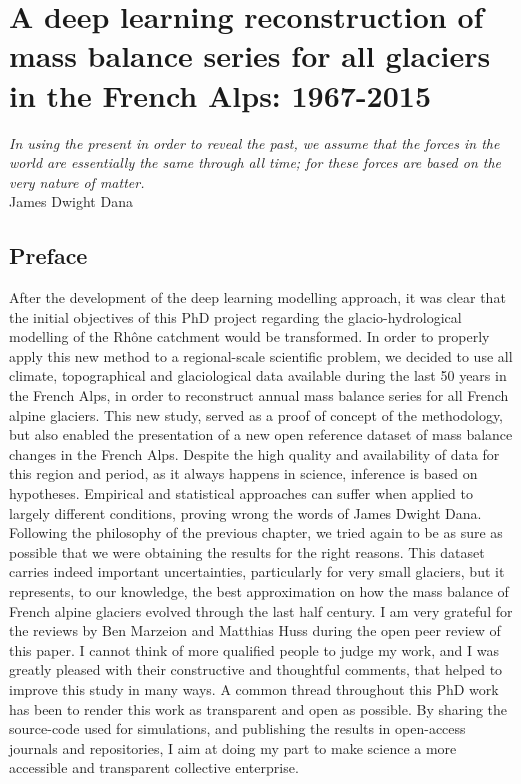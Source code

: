 \chapter{A deep learning reconstruction of mass balance series for all glaciers in the French Alps: 1967-2015}
\label{chap:past}

\begin{flushright}
{\small \textit{In using the present in order to reveal the past, we assume that the forces in the world are essentially the same through all time; for these forces are based on the very nature of matter.}\\
James Dwight Dana}
\end{flushright}

\section*{Preface}

After the development of the deep learning modelling approach, it was clear that the initial objectives of this PhD project regarding the glacio-hydrological modelling of the Rhône catchment would be transformed. In order to properly apply this new method to a regional-scale scientific problem, we decided to use all climate, topographical and glaciological data available during the last 50 years in the French Alps, in order to reconstruct annual mass balance series for all French alpine glaciers. This new study, served as a proof of concept of the methodology, but also enabled the presentation of a new open reference dataset of mass balance changes in the French Alps. Despite the high quality and availability of data for this region and period, as it always happens in science, inference is based on hypotheses. Empirical and statistical approaches can suffer when applied to largely different conditions, proving wrong the words of James Dwight Dana. Following the philosophy of the previous chapter, we tried again to be as sure as possible that we were obtaining the results for the right reasons. This dataset carries indeed important uncertainties, particularly for very small glaciers, but it represents, to our knowledge, the best approximation on how the mass balance of French alpine glaciers evolved through the last half century. I am very grateful for the reviews by Ben Marzeion and Matthias Huss during the open peer review of this paper. I cannot think of more qualified people to judge my work, and I was greatly pleased with their constructive and thoughtful comments, that helped to improve this study in many ways. A common thread throughout this PhD work has been to render this work as transparent and open as possible. By sharing the source-code used for simulations, and publishing the results in open-access journals and repositories, I aim at doing my part to make science a more accessible and transparent collective enterprise. 

